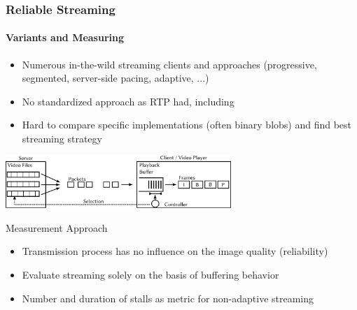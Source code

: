 \documentclass{beamer}
\begin{document}



\begin{frame}
	\frametitle{Reliable Streaming}
	\framesubtitle{Variants and Measuring}

	\begin{itemize}
		\item Numerous in-the-wild streaming clients and approaches (progressive, segmented, server-side pacing, adaptive, ...)
		\item No standardized approach as RTP had, including
		\item Hard to compare specific implementations (often binary blobs) and find best streaming strategy
	\end{itemize}

	\begin{center}
		\includegraphics[height=2cm]{../../chapters/03-streaming/images/playback-model.pdf}
	\end{center}

	Measurement Approach
	\begin{itemize}
		\item Transmission process has no influence on the image quality (reliability)
		\item Evaluate streaming solely on the basis of buffering behavior
		\item Number and duration of stalls as metric for non-adaptive streaming
	\end{itemize}
\end{frame}
\end{document}

